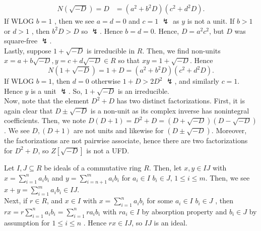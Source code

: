 \documentclass[a4paper]{article}
\begin{document}
\begin{problem}[2]
	\begin{align*}
		N\left( \sqrt{-D}  \right) = D &=  \left( a^2 + b^2D \right) \left( c^2 + d^2D \right)
	.\end{align*}
	If WLOG \(b =1\) , then we see \(a = d = 0\) and \(c = 1\)  \(\lightning\) as \(y\) is not a unit. If \(b > 1\) or \(d > 1\) , then \(b^2D > D\) so \(\lightning\). Hence \(b = d = 0\). Hence, \(D = a^2 c ^2\), but \(D\) was square-free \(\lightning\).\\
	Lastly, suppose \(1 + \sqrt{-D} \) is irreducible in \(R\). Then, we find non-units \(x = a+b\sqrt{-D} , y =  c + d\sqrt{-D}  \in R\) so that \(xy = 1 + \sqrt{-D} \). Hence \[
	N\left( 1 + \sqrt{-D}  \right) = 1+D = \left( a^2 + b^2D \right) \left( c^2 + d^2D \right)
	.\]
	If WLOG \( b = 1\), then \(d = 0\) otherwise \(1 + D > 2D^2\) \(\lightning\), and similarly \(c = 1\). Hence \(y\) is a unit \(\lightning\). So, \(1 + \sqrt{-D} \) is an irreducible.\\
	Now, note that the element \(D^2 + D\) has two distinct factorizations. First, it is again clear that \(D \pm \sqrt{-D} \) is a non-unit as its complex inverse has nonintegral coefficients. Then, we note \(D\left( D + 1 \right) = D^2 + D = \left( D + \sqrt{-D}  \right)\left( D - \sqrt{-D}  \right)  \). We see \(D, \left( D+1 \right) \) are not units and likewise  for \(\left( D \pm \sqrt{-D}   \right) \). Moreover, the factorizations are not pairwise associate, hence there are two factorizations for \(D^2 + D\), so \(Z\left[ \sqrt{-D}  \right] \) is not a UFD.
\end{problem}
\newpage
\begin{problem}[3]
Let \(I, J \subseteq R\) be ideals of a commutative ring \(R\). Then, let \(x, y \in IJ\) with \(x = \sum_{i= 1}^{n} a_{i}b_{i}\) and \(y = \sum_{i=n+1}^{m} a_{i} b_{i}\) for \(a_{i} \in I\) \(b_{i} \in J\), \(1 \le i \le m\). Then, we see \(x + y = \sum_{i= 1}^{m} a_{i} b_{i} \in IJ\).\\
Next, if \(r \in R\), and \(x \in I\) with \(x = \sum_{i= 1}^{n} a_{i} b_{i}\) for some \(a_{i} \in I\) \(b_{i} \in J\) , then \(rx = r \sum_{i= 1}^{n} a_{i} b_{i} = \sum_{i= 1}^{n} r a_{i} b_{i}\) with \(r a_{i} \in I\) by absorption property and \(b_{i} \in J\) by assumption for \(1 \le i \le n\)  . Hence \(rx \in IJ\), so \(IJ\) is an ideal.
\end{problem}
\newpage
\end{document}
